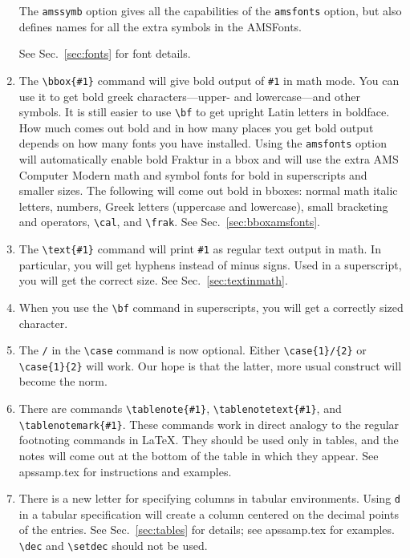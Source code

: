 \begin{enumerate}
The \verb+amssymb+ option gives all the capabilities of the \verb+amsfonts+
option, but also defines names for all the extra symbols in the AMSFonts.

See Sec.\ \ref{sec:fonts} for font details.

\item The \verb+\bbox{#1}+ command will give bold output of \verb+#1+ in
math mode. You can use it to get bold greek characters---upper- and
lowercase---and other symbols. It is still easier to use \verb+\bf+ to get
upright Latin letters in boldface. How much comes out bold and in how many
places you get bold output depends on how many fonts you have installed.
Using the \verb+amsfonts+ option will automatically enable bold Fraktur in
a bbox and will use the extra AMS Computer Modern math and symbol fonts for
bold in superscripts and smaller sizes. The following will come out bold in
bboxes: normal math italic letters, numbers, Greek letters (uppercase and
lowercase), small bracketing and operators, \verb+\cal+, and \verb+\frak+.
See Sec.\ \ref{sec:bboxamsfonts}.

\item The \verb+\text{#1}+ command will print \verb+#1+ as regular text
output in math. In particular, you will get hyphens instead of minus signs.
Used in a superscript, you will get the correct size. See Sec.\
\ref{sec:textinmath}.

\item When you use the \verb+\bf+ command in superscripts, you will get a
correctly sized character.

\item The \verb+/+ in the \verb+\case+ command is now optional. Either
\verb+\case{1}/{2}+ or \verb+\case{1}{2}+ will work. Our hope is that the
latter, more usual construct will become the norm.


\item There are commands \verb+\tablenote{#1}+, \verb+\tablenotetext{#1}+,
and \verb+\tablenotemark{#1}+. These commands work in direct analogy to the
regular footnoting commands in \LaTeX{}. They should be used only in
tables, and the notes will come out at the bottom of the table in which
they appear. See apssamp.tex for instructions and examples.


\item There is a new letter for specifying columns in tabular environments.
Using \verb+d+ in a tabular specification will create a column centered on
the decimal points of the entries. See Sec.\ \ref{sec:tables} for details;
see apssamp.tex for examples. \verb+\dec+ and \verb+\setdec+ should not be
used.


\end{enumerate}
